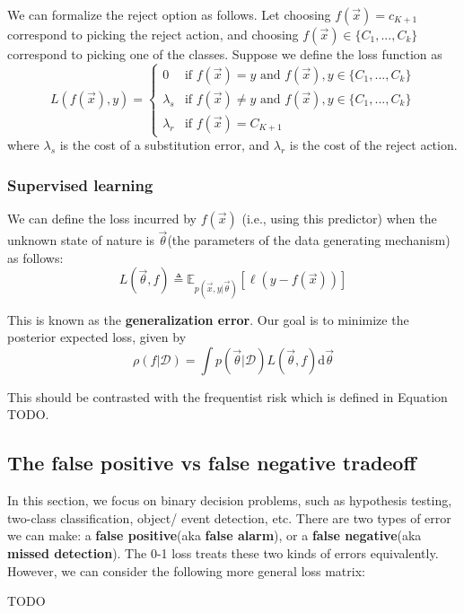 We can formalize the reject option as follows. Let choosing $f(\vec{x})=c_{K+1}$ correspond to picking the reject action, and choosing $f(\vec{x}) \in \{C_1,...,C_k\}$ correspond to picking one of the classes. Suppose we define the loss function as
\begin{equation}
L(f(\vec{x}), y)=\begin{cases} 
0 & \text{if } f(\vec{x})=y \text{ and } f(\vec{x}),y \in \{C_1,...,C_k\} \\
\lambda_s & \text{if } f(\vec{x}) \neq y \text{ and } f(\vec{x}),y \in \{C_1,...,C_k\} \\
\lambda_r & \text{if } f(\vec{x})=C_{K+1}
\end{cases}
\end{equation}
where $\lambda_s$ is the cost of a substitution error, and $\lambda_r$ is the cost of the reject action. 


\subsubsection{Supervised learning}
We can define the loss incurred by $f(\vec{x})$ (i.e., using this predictor) when the unknown state of nature is $\vec{\theta}$(the parameters of the data generating mechanism) as follows:
\begin{equation}
L(\vec{\theta},f) \triangleq \mathbb{E}_{p(\vec{x},y|\vec{\theta})}[\ell(y-f(\vec{x}))]
\end{equation}

This is known as the \textbf{generalization error}. Our goal is to minimize the posterior expected loss, given by
\begin{equation}
\rho(f|\mathcal{D}) = \int{p(\vec{\theta}|\mathcal{D})L(\vec{\theta},f)}\mathrm{d}\vec{\theta}
\end{equation}

This should be contrasted with the frequentist risk which is defined in Equation TODO.


\subsection{The false positive vs false negative tradeoff}
In this section, we focus on binary decision problems, such as hypothesis testing, two-class classification, object/ event detection, etc. There are two types of error we can make: a \textbf{false positive}(aka \textbf{false alarm}), or a \textbf{false negative}(aka \textbf{missed detection}). The 0-1 loss treats these two kinds of errors equivalently. However, we can consider the following more general loss matrix:

TODO
